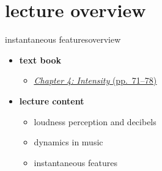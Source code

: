 

\subtitle{Part 4.3: Feature Post-Processing}


	

    \section[overview]{lecture overview}
        \begin{frame}{instantaneous features}{overview}
            \begin{itemize}
                \item   \textbf{text book}  
                    \begin{itemize}
                        \item   \href{http://ieeexplore.ieee.org/xpl/articleDetails.jsp?tp=&arnumber=6331121&}{\underline{\textit{Chapter 4: Intensity} (pp.~71--78)}}
                    \end{itemize}
                \bigskip
                \item<2->   \textbf{lecture content}
                    \begin{itemize}
                        \item<2->   loudness perception and decibels
                        \item<3->   dynamics in music
                        \item<4->   instantaneous features
                    \end{itemize}
            \end{itemize}
        \end{frame}

